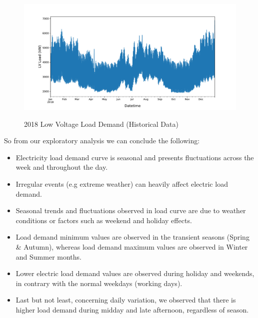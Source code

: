 \begin{figure}[htbp]
\centering
\includegraphics[width=1\linewidth]{project/eda5.pdf}
\label{fig:felix}
\caption{2018 Low Voltage Load Demand (Historical Data)}
\end{figure}
\par So from our exploratory analysis we can conclude the following:
\begin{itemize}
    \item Electricity load demand curve is seasonal and presents fluctuations across the week and throughout the day.
    \item Irregular events (e.g extreme weather) can heavily affect electric load demand.
    \item Seasonal trends and fluctuations observed in load curve are due to weather conditions or factors such as weekend and holiday effects.
    \item Load demand minimum values are observed in the transient seasons (Spring \& Autumn), whereas load demand maximum values are observed in Winter and Summer months.
    \item Lower electric load demand values are observed during holiday and weekends, in contrary with the normal weekdays (working days).
   \item  Last but not least, concerning daily variation, we observed that there is higher load demand during midday and late afternoon, regardless of season.
\end{itemize}
\newpage
